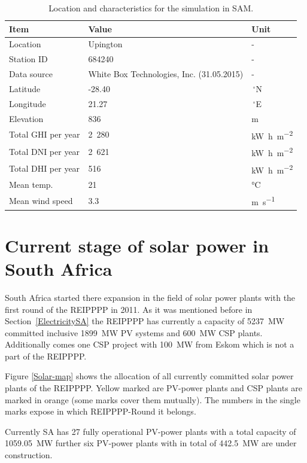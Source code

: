\begin{table}[!h]  
  \centering
	\begin{tabular}{  p{4.0cm}  C{4.0cm}  C{3.0cm} } 
	\hline	
\textbf{Item}  & \textbf{Value} & \textbf{Unit} \\ \hline \hline
Location & Upington & -\\ 
Station ID &  684240& -  \\ 
Data source & White Box Technologies, Inc. (31.05.2015) & -\\ \hline
Latitude & -28.40 &$\,^{\circ}$N \\ 
Longitude &  21.27 &$\,^{\circ}$E \\ 
Elevation &  836 & m \\ 
Total GHI per year  &  2~280 & \si{\kilo\watt\hour\per\square\metre}\\ 
Total DNI per year &  2~621 & \si{\kilo\watt\hour\per\square\metre}\\ 
Total DHI per year &  516 & \si{\kilo\watt\hour\per\square\metre}\\ 
Mean temp. &  21 & \si{\celsius}\\ 
Mean wind speed & 3.3 & \si{\metre\per\second}\\ \hline
\end{tabular}
\caption[Location and characteristics for the simulation in SAM.]{Location and characteristics for the simulation in SAM.}\label{tbl: Location}
\end{table}
\pagebreak
\section{Current stage of solar power in South Africa}
South Africa started there expansion in the field of solar power plants with the first round of the REIPPPP in 2011. As it was mentioned before in Section~\ref{ElectricitySA} the REIPPPP has currently a capacity of \SI{5237}{\mega\watt} committed inclusive \SI{1899}{\mega\watt} PV systems and \SI{600}{\mega\watt} CSP plants. Additionally comes one CSP project with \SI{100}{\mega\watt} from Eskom which is not a part of the REIPPPP.

Figure \ref{Solar-map} shows the allocation of all currently committed solar power plants of the REIPPPP. Yellow marked are PV-power plants and CSP plants are marked in orange (some marks cover them mutually). The numbers in the single marks expose in which REIPPPP-Round it belongs.

Currently SA has 27 fully operational PV-power plants with a total capacity of \SI{1059.05}{\mega\watt} further six PV-power plants with in total of \SI{442.5}{\mega\watt} are under construction. \cite{Forder2015}

